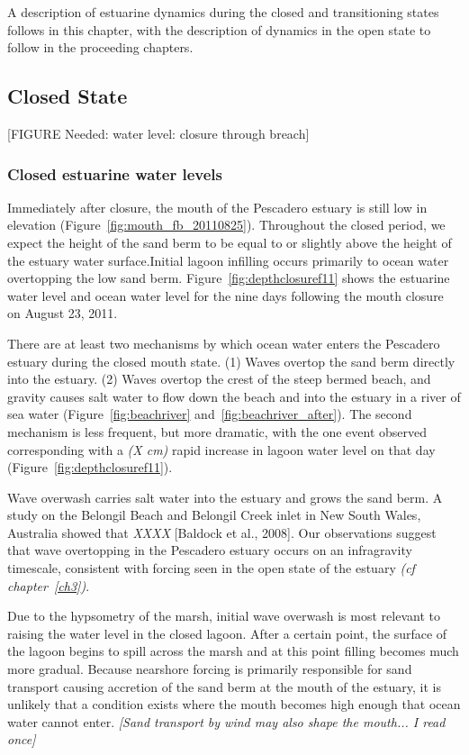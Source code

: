 A description of estuarine dynamics during the closed and transitioning states follows in this chapter, with the description of dynamics in the open state to follow in the proceeding chapters.


\subsection{Closed State} \label{ssec:ClosedDynamics}


[FIGURE Needed: water level: closure through breach]


\subsubsection{Closed estuarine water levels} \label{cl_wl}

Immediately after closure, the mouth of the Pescadero estuary is still low in elevation (Figure~\ref{fig:mouth_fb_20110825}). Throughout the closed period, we expect the height of the sand berm to be equal to or slightly above the height of the estuary water surface.Initial lagoon infilling occurs primarily to ocean water overtopping the low sand berm. Figure~\ref{fig:depthclosuref11} shows the estuarine water level and ocean water level for the nine days following the mouth closure on August 23, 2011.  

There are at least two mechanisms by which ocean water enters the Pescadero estuary during the closed mouth state. (1) Waves overtop the sand berm directly into the estuary. (2) Waves overtop the crest of the steep bermed beach, and gravity causes salt water to flow down the beach and into the estuary in a river of sea water (Figure~\ref{fig:beachriver} and~\ref{fig:beachriver_after}). The second mechanism is less frequent, but more dramatic, with the one event observed corresponding with a \emph{(X cm)} rapid increase in lagoon water level on that day (Figure~\ref{fig:depthclosuref11}).

Wave overwash carries salt water into the estuary and grows the sand berm. A study on the Belongil Beach and Belongil Creek inlet in New South Wales, Australia showed that \emph{XXXX} [Baldock et al., 2008]. Our observations suggest that wave overtopping in the Pescadero 
estuary occurs on an infragravity timescale, consistent with forcing seen in the open state of the estuary \emph{(cf chapter~\ref{ch3})}.

Due to the hypsometry of the marsh, initial wave overwash is most relevant to raising the water level in the closed lagoon. After a certain point, the surface of the lagoon begins to spill across the marsh and at this point filling becomes much more gradual. Because nearshore forcing is primarily responsible for sand transport causing accretion of the sand berm at the mouth of the estuary, it is unlikely that a condition exists where the mouth becomes high enough that ocean water cannot enter. \emph{[Sand transport by wind may also shape the mouth... I read once]}




